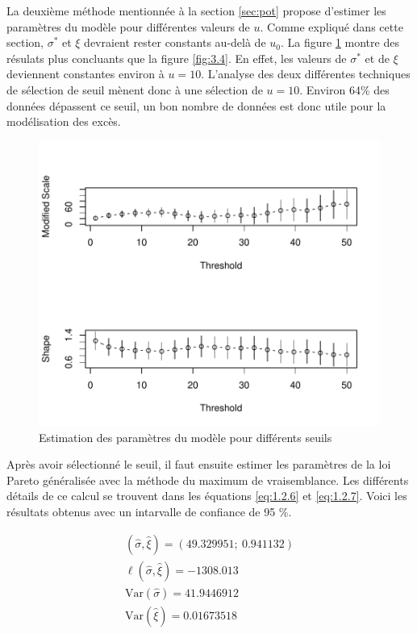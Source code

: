 La deuxième méthode mentionnée à la section \ref{sec:pot} propose d'estimer les paramètres du modèle pour différentes valeurs de $u$. Comme expliqué dans cette section, $\sigma^*$ et $\xi$ devraient rester constants au-delà de $u_0$. La figure \ref{fig:3.5} montre des résulats plus concluants que la figure \ref{fig:3.4}. En effet, les valeurs de $\sigma^*$ et de $\xi$ deviennent constantes environ à $u=10$. L'analyse des deux différentes techniques de sélection de seuil mènent donc à une sélection de $u=10$. Environ 64\% des données dépassent ce seuil, un bon nombre de données est donc utile pour la modélisation des excès.
\begin{figure}[h]
\begin{center}
\includegraphics{images/fig-010}
\end{center}
\caption{Estimation des paramètres du modèle pour différents seuils}
\label{fig:3.5}
\end{figure}

Après avoir sélectionné le seuil, il faut ensuite estimer les paramètres de la loi Pareto généralisée avec la méthode du maximum de vraisemblance. Les différents détails de ce calcul se trouvent dans les équations \ref{eq:1.2.6} et \ref{eq:1.2.7}. Voici les résultats obtenus avec un intarvalle de confiance de 95 \%.

\begin{equation*}
\begin{gathered}
(\hat\sigma,\hat\xi) = (49.329951;\ 0.941132)\\
\ell(\hat\sigma,\hat\xi) = -1308.013\\
\text{Var}(\hat\sigma) = 41.9446912\\
\text{Var}(\hat\xi) = 0.01673518
\end{gathered}
\end{equation*}
\

